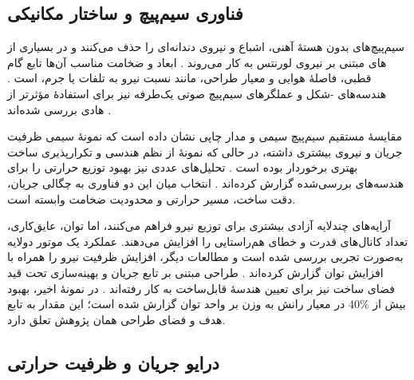 \subsection{فناوری سیم‌پیچ و ساختار مکانیکی}
\label{subsec:active_component_and_coils}
\label{subsec:coil-mechanical-implementation}

سیم‌پیچ‌های بدون هستهٔ آهنی، اشباع و نیروی دندانه‌ای را حذف می‌کنند و در بسیاری از های مبتنی بر نیروی لورنتس به کار می‌روند \cite{jansenModelingMagneticallyLevitated2007,pierrejeanReviewModelingDesign2024}. ابعاد و ضخامت مناسب آن‌ها تابع گام قطبی، فاصلهٔ هوایی و معیار طراحی، مانند نسبت نیرو به تلفات یا جرم، است \cite{zhangOptimalMatchingDesign2019,zhangAnalyticalApproachDetermine2016}. هندسه‌های -شکل و عملگرهای سیم‌پیچ صوتی یک‌طرفه نیز برای استفادهٔ مؤثرتر از هادی بررسی شده‌اند \cite{zhangDesignStudyHigh2021,yangDesign200NMagnetic2024}.

مقایسهٔ مستقیم سیم‌پیچ سیمی و مدار چاپی نشان داده است که نمونهٔ سیمی ظرفیت جریان و نیروی بیشتری داشته، در حالی که نمونهٔ  از نظم هندسی و تکرارپذیری ساخت بهتری برخوردار بوده است \cite{huComparativeAnalysisWireWound2025}. تحلیل‌های عددی  نیز بهبود توزیع حرارتی را برای هندسه‌های بررسی‌شده گزارش کرده‌اند \cite{zhangNumericalModelingStructure2025}. انتخاب میان این دو فناوری به چگالی جریان، دقت ساخت، مسیر حرارتی و محدودیت ضخامت وابسته است.

آرایه‌های چندلایه آزادی بیشتری برای توزیع نیرو فراهم می‌کنند، اما توان، عایق‌کاری، تعداد کانال‌های قدرت و خطای هم‌راستایی را افزایش می‌دهند. عملکرد یک موتور دولایه به‌صورت تجربی بررسی شده است \cite{roversDesignMeasurementsDouble2013} و مطالعات دیگر، افزایش ظرفیت نیرو را همراه با افزایش توان گزارش کرده‌اند \cite{liuAnalysisElectromagneticForce2024}. طراحی مبتنی بر تابع جریان و بهینه‌سازی تحت قید فضای ساخت نیز برای تعیین هندسهٔ قابل‌ساخت به کار رفته‌اند \cite{guoAnalysisDesignMagnetically2015,kuijpersCoilDesignMovingMagnet2025,zengSpatialConstrainedStructureOptimization2026h}. در نمونهٔ اخیر، بهبود بیش از \(40\%\) در معیار رانش به وزن بر واحد توان گزارش شده است؛ این مقدار به تابع هدف و فضای طراحی همان پژوهش تعلق دارد.

\subsection{درایو جریان و ظرفیت حرارتی}
\label{subsec:drive_and_current_authority}
\label{subsec:thermal-loss-duty-allocation}
\label{subsec:power-reduction-thermal-management}

